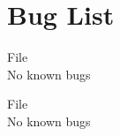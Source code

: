 \chapter{Bug List}
\hypertarget{bug}{}\label{bug}

\begin{DoxyRefList}
\item[File \doxylink{matrix_8cpp}{matrix.cpp} ]\hfill \\
\label{bug__bug000002}%
%
No known bugs  
\item[File \doxylink{matrix_8h}{matrix.h} ]\hfill \\
\label{bug__bug000001}%
%
No known bugs 
\end{DoxyRefList}